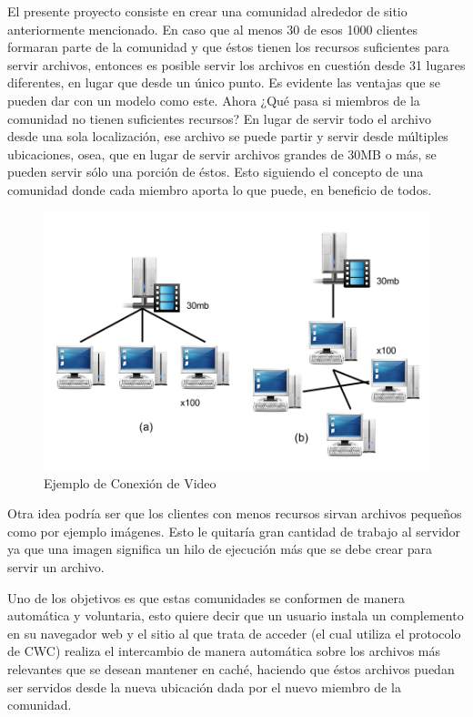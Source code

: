 El presente proyecto consiste en crear una comunidad alrededor de sitio anteriormente mencionado. En caso que al menos 30 de esos 1000 clientes formaran parte de la comunidad y que éstos tienen los recursos suficientes para servir archivos, entonces es posible servir los archivos en cuestión desde 31 lugares diferentes, en lugar que desde un único punto. Es evidente las ventajas que se pueden dar con un modelo como este. Ahora ¿Qué pasa si miembros de la comunidad no tienen suficientes recursos? En lugar de servir todo el archivo desde una sola localización, ese archivo se puede partir y servir desde múltiples ubicaciones, osea, que en lugar de servir archivos grandes de 30MB o más, se pueden servir sólo una porción de éstos. Esto siguiendo el concepto de una comunidad donde cada miembro aporta lo que puede, en beneficio de todos. 

\begin{figure}[h]
  \centering
    \includegraphics[scale=0.7]{gfx/conexion_video}
  \caption{Ejemplo de Conexión de Video}
  \label{conexionvideo}
\end{figure}

Otra idea podría ser que los clientes con menos recursos sirvan archivos pequeños como por ejemplo imágenes. Esto le quitaría gran cantidad de trabajo al servidor ya que una imagen significa un hilo de ejecución más que se debe crear para servir un archivo.

Uno de los objetivos es que estas comunidades se conformen de manera automática y voluntaria, esto quiere decir que un usuario instala un complemento en su navegador web y el sitio al que trata de acceder (el cual utiliza el protocolo de CWC) realiza el intercambio de manera automática sobre los archivos más relevantes que se desean mantener en caché, haciendo que éstos archivos puedan ser servidos desde la nueva ubicación dada por el nuevo miembro de la comunidad.

